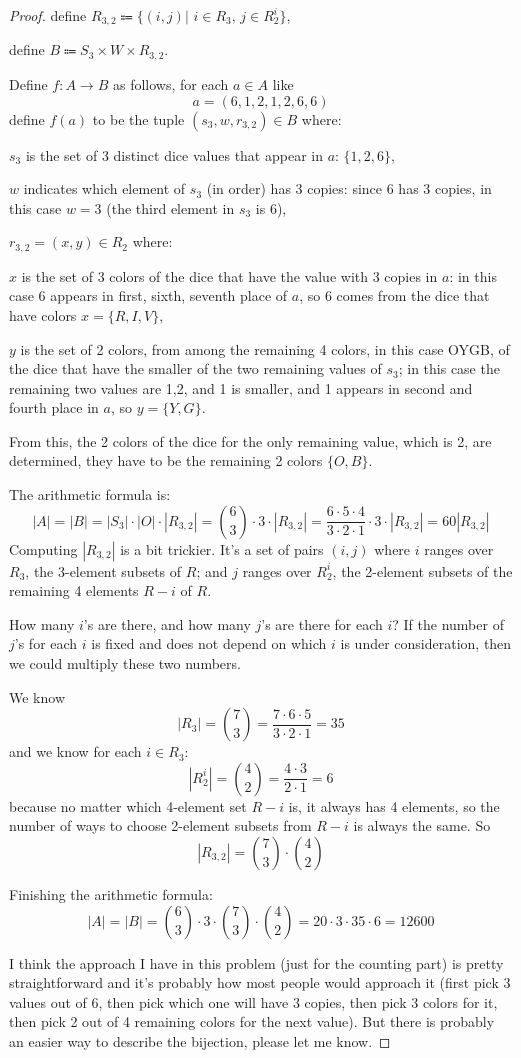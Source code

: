 \documentclass[14pt]{extarticle}
\begin{document}
\begin{proof}
define $\displaystyle R_{3,2} \Coloneqq \{ (i, j) | \,\, i \in R_3, \, j \in R_2^i\}$,

define $B \Coloneqq S_3 \times W \times R_{3,2}$.

Define $f : A \to B$ as follows, for each $a \in A$ like
$$
a = (6, 1, 2, 1, 2, 6, 6)
$$
define $f(a)$ to be the tuple $(s_3, w, r_{3,2}) \in B$ where:

$s_3$ is the set of 3 distinct dice values that appear in $a$: $\{1,2,6\}$,

$w$ indicates which element of $s_3$ (in order) has 3 copies: since 6 has 3 copies, in this case $w = 3$ (the third element in $s_3$ is 6),

$r_{3,2} = (x, y) \in R_2$ where:

$x$ is the set of 3 colors of the dice that have the value with 3 copies in $a$: in this case 6 appears in first, sixth, seventh place of $a$, so 6 comes from the dice that have colors $x = \{R,I,V\}$, 

$y$ is the set of 2 colors, from among the remaining 4 colors, in this case OYGB, of the dice that have the smaller of the two remaining values of $s_3$; in this case the remaining two values are 1,2, and 1 is smaller, and 1 appears in second and fourth place in $a$, so $y = \{Y,G\}$.

From this, the 2 colors of the dice for the only remaining value, which is 2, are determined, they have to be the remaining 2 colors $\{O,B\}$.

The arithmetic formula is:
$$
|A| = |B| = |S_3| \cdot |O| \cdot |R_{3,2}| = \binom{6}{3} \cdot 3 \cdot |R_{3,2}| = \frac{6\cdot 5 \cdot 4}{3\cdot 2\cdot 1}\cdot 3 \cdot |R_{3,2}| = 60|R_{3,2}|
$$
Computing $|R_{3,2}|$ is a bit trickier. It's a set of pairs $(i, j)$ where $i$ ranges over $R_3$, the 3-element subsets of $R$; and $j$ ranges over $R_2^i$, the 2-element subsets of the remaining 4 elements $R - i$ of $R$. 

How many $i$'s are there, and how many $j$'s are there for each $i$? If the number of $j$'s for each $i$ is fixed and does not depend on which $i$ is under consideration, then we could multiply these two numbers.

We know 
$$
|R_3| = \binom{7}{3} = \frac{7\cdot 6 \cdot 5}{3\cdot 2\cdot 1} = 35 
$$
and we know for each $i \in R_3$:
$$
|R_2^i| = \binom{4}{2} = \frac{4\cdot 3}{2\cdot 1} = 6 
$$
because no matter which 4-element set $R - i$ is, it always has 4 elements, so the number of ways to choose 2-element subsets from $R-i$ is always the same. So
$$
|R_{3,2}| = \binom{7}{3} \cdot \binom{4}{2}
$$

Finishing the arithmetic formula:
$$
|A| = |B| = \binom{6}{3}\cdot 3 \cdot \binom{7}{3} \cdot \binom{4}{2} =  20 \cdot 3 \cdot 35 \cdot 6 = 12600
$$

I think the approach I have in this problem (just for the counting part) is pretty straightforward and it's probably how most people would approach it (first pick 3 values out of 6, then pick which one will have 3 copies, then pick 3 colors for it, then pick 2 out of 4 remaining colors for the next value). But there is probably an easier way to describe the bijection, please let me know.
\end{proof}
\end{document}
